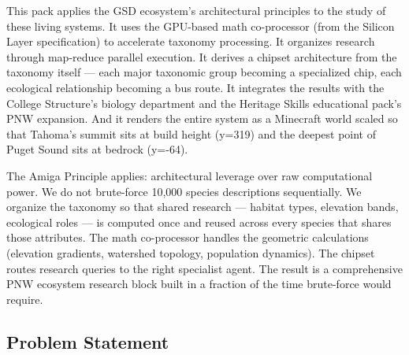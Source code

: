 \documentclass[11pt,letterpaper]{article}
\begin{document}
This pack applies the GSD ecosystem's architectural principles to the study of these living systems. It uses the GPU-based math co-processor (from the Silicon Layer specification) to accelerate taxonomy processing. It organizes research through map-reduce parallel execution. It derives a chipset architecture from the taxonomy itself --- each major taxonomic group becoming a specialized chip, each ecological relationship becoming a bus route. It integrates the results with the College Structure's biology department and the Heritage Skills educational pack's PNW expansion. And it renders the entire system as a Minecraft world scaled so that Tahoma's summit sits at build height (y=319) and the deepest point of Puget Sound sits at bedrock (y=-64).

The Amiga Principle applies: architectural leverage over raw computational power. We do not brute-force 10,000 species descriptions sequentially. We organize the taxonomy so that shared research --- habitat types, elevation bands, ecological roles --- is computed once and reused across every species that shares those attributes. The math co-processor handles the geometric calculations (elevation gradients, watershed topology, population dynamics). The chipset routes research queries to the right specialist agent. The result is a comprehensive PNW ecosystem research block built in a fraction of the time brute-force would require.

\subsection{Problem Statement}
\end{document}
